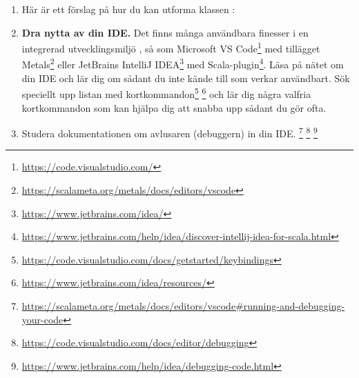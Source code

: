 \begin{enumerate}[leftmargin=*]
\item Här är ett förslag på hur du kan utforma klassen :
%
%
%
%
%
%
%
%
%
%

\item \textbf{Dra nytta av din IDE.} Det finns många användbara finesser i en integrerad utvecklingsmiljö , så som Microsoft VS Code\footnote{\url{https://code.visualstudio.com/}} med tillägget Metals\footnote{\url{https://scalameta.org/metals/docs/editors/vscode}} eller JetBrains IntelliJ IDEA\footnote{\url{https://www.jetbrains.com/idea/}} med Scala-plugin\footnote{\url{https://www.jetbrains.com/help/idea/discover-intellij-idea-for-scala.html}}. Läsa på nätet om din IDE och lär dig om sådant du inte kände till som verkar användbart. Sök speciellt upp listan med kortkommandon\footnote{\url{https://code.visualstudio.com/docs/getstarted/keybindings}} \footnote{\url{https://www.jetbrains.com/idea/resources/}}  och lär dig några valfria kortkommandon som kan hjälpa dig att snabba upp sådant du gör ofta. 
\item Studera dokumentationen om avlusaren (debuggern) in din IDE. \footnote{\url{https://scalameta.org/metals/docs/editors/vscode\#running-and-debugging-your-code}}  \footnote{\url{https://code.visualstudio.com/docs/editor/debugging}}  \footnote{\url{https://www.jetbrains.com/help/idea/debugging-code.html}} 
\end{enumerate}
